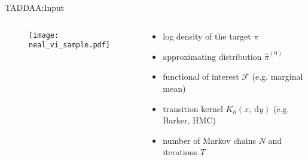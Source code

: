 \documentclass[10pt,xcolor=table]{beamer}
\begin{document}
\begin{frame}{TADDAA:Input}
\begin{columns}
  \begin{column}{0.5\linewidth}
\begin{figure}
  \begin{center}
    \texttt{[image: neal\_vi\_sample.pdf]}
  \end{center}
\end{figure}
  \end{column}
  \begin{column}{0.5 \linewidth}

        \begin{itemize}
            \item log density of the target $\pi$
            \item approximating distribution $\hat{\pi}^{(0)}$ \pause
            \item functional of interest $\mathcal{F}$ (e.g. marginal mean) \pause
            \item transition kernel $K_h(x, \mathrm{~d} y)$ (e.g. Barker, HMC) %
            \item number of Markov chains $N$ and iterations $T$
        \end{itemize}
  \end{column}
\end{columns}
\end{frame}
\end{document}
